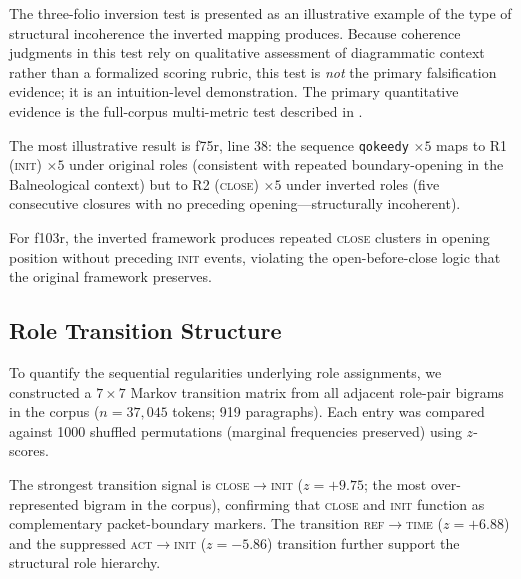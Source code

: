 \documentclass[11pt,a4paper,twocolumn]{article}
\begin{document}
\noindent The three-folio inversion test is presented as an illustrative example of the type of structural incoherence the inverted mapping produces. Because coherence judgments in this test rely on qualitative assessment of diagrammatic context rather than a formalized scoring rubric, this test is \textit{not} the primary falsification evidence; it is an intuition-level demonstration. The primary quantitative evidence is the full-corpus multi-metric test described in .

The most illustrative result is f75r, line 38: the sequence \texttt{qokeedy} $\times 5$ maps to R1 (\textsc{init}) $\times 5$ under original roles (consistent with repeated boundary-opening in the Balneological context) but to R2 (\textsc{close}) $\times 5$ under inverted roles (five consecutive closures with no preceding opening---structurally incoherent).

For f103r, the inverted framework produces repeated \textsc{close} clusters in opening position without preceding \textsc{init} events, violating the open-before-close logic that the original framework preserves.

\subsection{Role Transition Structure}
\label{sec:markov}

To quantify the sequential regularities underlying role assignments, we constructed a $7 \times 7$ Markov transition matrix from all adjacent role-pair bigrams in the corpus ($n=37{,}045$ tokens; 919 paragraphs). Each entry was compared against 1000 shuffled permutations (marginal frequencies preserved) using $z$-scores.

The strongest transition signal is \textsc{close}$\to$\textsc{init} ($z=+9.75$; the most over-represented bigram in the corpus), confirming that \textsc{close} and \textsc{init} function as complementary packet-boundary markers. The transition \textsc{ref}$\to$\textsc{time} ($z=+6.88$) and the suppressed \textsc{act}$\to$\textsc{init} ($z=-5.86$) transition further support the structural role hierarchy.
\end{document}

